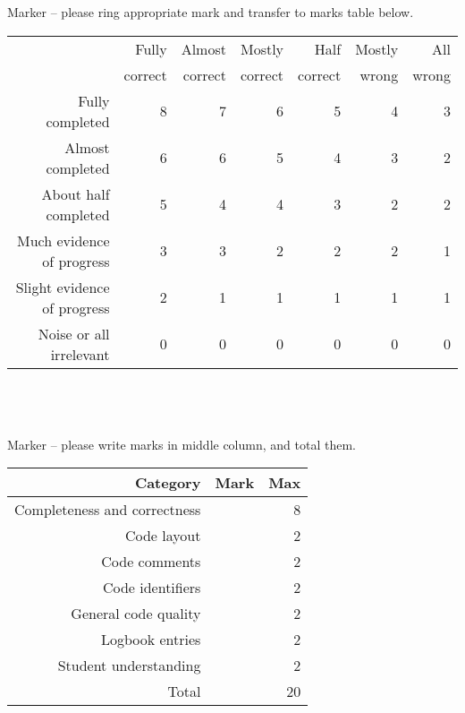 \parbox{\textwidth}{
 \\
 \\
Marker -- please ring appropriate mark and transfer to marks table below. \\

\begin{tabular}{||r||r|r|r|r|r|r||} \hline \hline
                            & Fully   & Almost  & Mostly  & Half    & Mostly & All   \\
                            & correct & correct & correct & correct & wrong  & wrong \\ \hline
\hline
Fully completed             &       8 &         7 &     6 &       5 &      4 &     3 \\ \hline
Almost completed            &       6 &         6 &     5 &       4 &      3 &     2 \\ \hline
About half completed        &       5 &         4 &     4 &       3 &      2 &     2 \\ \hline
Much evidence of progress   &       3 &         3 &     2 &       2 &      2 &     1 \\ \hline
Slight evidence of progress &       2 &         1 &     1 &       1 &      1 &     1 \\ \hline
Noise or all irrelevant     &       0 &         0 &     0 &       0 &      0 &     0 \\ \hline
\hline 
\end{tabular} \\ \\

 \\
Marker -- please write marks in middle column, and total them. \\


\begin{tabular}{||r|r|r||} \hline \hline
Category                     & Mark & Max \\ \hline
\hline
Completeness and correctness &      &  8 \\ \hline
Code layout                  &      &  2 \\ \hline
Code comments                &      &  2 \\ \hline
Code identifiers             &      &  2 \\ \hline
General code quality         &      &  2 \\ \hline
Logbook entries              &      &  2 \\ \hline
Student understanding        &      &  2 \\ \hline
\hline
Total                        &      & 20 \\ \hline
\hline
\end{tabular} \\ \\

}
